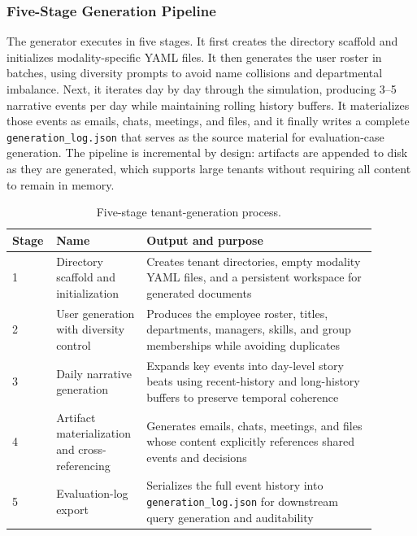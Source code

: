 \subsubsection{Five-Stage Generation Pipeline}

The generator executes in five stages. It first creates the directory scaffold and initializes modality-specific YAML files. It then generates the user roster in batches, using diversity prompts to avoid name collisions and departmental imbalance. Next, it iterates day by day through the simulation, producing 3--5 narrative events per day while maintaining rolling history buffers. It materializes those events as emails, chats, meetings, and files, and it finally writes a complete \texttt{generation\_log.json} that serves as the source material for evaluation-case generation. The pipeline is incremental by design: artifacts are appended to disk as they are generated, which supports large tenants without requiring all content to remain in memory.

\begin{table}[h]
\centering
\caption{Five-stage tenant-generation process.}
\label{tab:generation_pipeline}
\small
\begin{tabular}{p{0.07\linewidth}p{0.22\linewidth}p{0.60\linewidth}}
\toprule
\textbf{Stage} & \textbf{Name} & \textbf{Output and purpose} \\
\midrule
1 & Directory scaffold and initialization & Creates tenant directories, empty modality YAML files, and a persistent workspace for generated documents \\
2 & User generation with diversity control & Produces the employee roster, titles, departments, managers, skills, and group memberships while avoiding duplicates \\
3 & Daily narrative generation & Expands key events into day-level story beats using recent-history and long-history buffers to preserve temporal coherence \\
4 & Artifact materialization and cross-referencing & Generates emails, chats, meetings, and files whose content explicitly references shared events and decisions \\
5 & Evaluation-log export & Serializes the full event history into \texttt{generation\_log.json} for downstream query generation and auditability \\
\bottomrule
\end{tabular}

\end{table}

